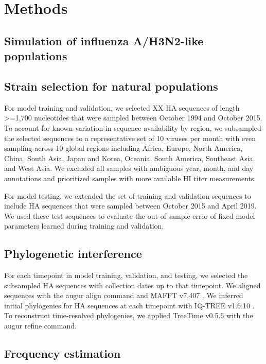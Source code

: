 \section*{Methods}

\subsection*{Simulation of influenza A/H3N2-like populations}

\subsection*{Strain selection for natural populations}

For model training and validation, we selected XX HA sequences of length >=1,700 nucleotides that were sampled between October 1994 and October 2015.
To account for known variation in sequence availability by region, we subsampled the selected sequences to a representative set of 10 viruses per month with even sampling across 10 global regions including Africa, Europe, North America, China, South Asia, Japan and Korea, Oceania, South America, Southeast Asia, and West Asia.
We excluded all samples with ambiguous year, month, and day annotations and prioritized samples with more available HI titer measurements.

For model testing, we extended the set of training and validation sequences to include HA sequences that were sampled between October 2015 and April 2019.
We used these test sequences to evaluate the out-of-sample error of fixed model parameters learned during training and validation.

\subsection*{Phylogenetic interference}

For each timepoint in model training, validation, and testing, we selected the subsampled HA sequences with collection dates up to that timepoint.
We aligned sequences with the augur align command \cite{Hadfield2018} and MAFFT v7.407 \cite{Katoh2002}.
We inferred initial phylogenies for HA sequences at each timepoint with IQ-TREE v1.6.10 \cite{Nguyen2014}.
To reconstruct time-resolved phylogenies, we applied TreeTime v0.5.6 \cite{Sagulenko2018} with the augur refine command.

\subsection*{Frequency estimation}

